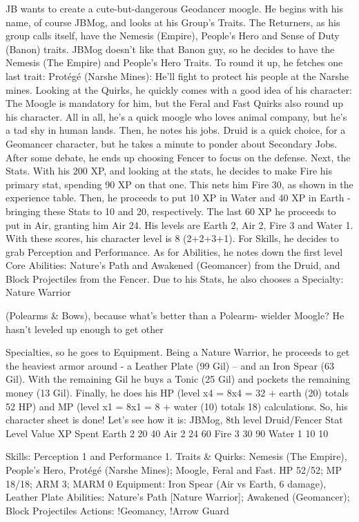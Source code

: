 \begin{multicols}{2}
JB wants to create a cute-but-dangerous Geodancer
moogle. He begins with his name, of course JBMog, and
looks at his Group's Traits. The Returners, as his group
calls itself, have the Nemesis (Empire), People's Hero and
Sense of Duty (Banon) traits. JBMog doesn't like that
Banon guy, so he decides to have the Nemesis (The
Empire) and People's Hero Traits. To round it up, he
fetches one last trait: Protégé (Narshe Mines): He'll fight
to protect his people at the Narshe mines.
Looking at the Quirks, he quickly comes with a
good idea of his character: The Moogle is mandatory for
him, but the Feral and Fast Quirks also round up his
character. All in all, he's a quick moogle who loves animal
company, but he's a tad shy in human lands.
Then, he notes his jobs. Druid is a quick choice,
for a Geomancer character, but he takes a minute to
ponder about Secondary Jobs. After some debate, he ends
up choosing Fencer to focus on the defense.
Next, the Stats. With his 200 XP, and looking at
the stats, he decides to make Fire his primary stat,
spending 90 XP on that one. This nets him Fire 30, as
shown in the experience table. Then, he proceeds to put
10 XP in Water and 40 XP in Earth - bringing these Stats
to 10 and 20, respectively. The last 60 XP he proceeds to
put in Air, granting him Air 24. His levels are Earth 2, Air
2, Fire 3 and Water 1. With these scores, his character
level is 8 (2+2+3+1). For Skills, he decides to grab
Perception and Performance.
As for Abilities, he notes down the first level Core
Abilities: Nature's Path and Awakened (Geomancer) from
the Druid, and Block Projectiles from the Fencer. Due to
his Stats, he also chooses a Specialty: Nature Warrior

(Polearms \& Bows), because what’s better than a Polearm-
wielder Moogle? He hasn't leveled up enough to get other

Specialties, so he goes to Equipment.
Being a Nature Warrior, he proceeds to get the
heaviest armor around - a Leather Plate (99 Gil) – and an
Iron Spear (63 Gil). With the remaining Gil he buys a
Tonic (25 Gil) and pockets the remaining money (13 Gil).
Finally, he does his HP (level x4 = 8x4 = 32 + earth (20)
totals 52 HP) and MP (level x1 = 8x1 = 8 + water (10)
totals 18) calculations.
So, his character sheet is done! Let's see how it is:
JBMog, 8th level Druid/Fencer
Stat Level Value XP Spent
Earth 2 20 40
Air 2 24 60
Fire 3 30 90
Water 1 10 10

Skills: Perception 1 and Performance 1.
Traits \& Quirks: Nemesis (The Empire), People's Hero,
Protégé (Narshe Mines); Moogle, Feral and Fast.
HP 52/52; MP 18/18; ARM 3; MARM 0
Equipment: Iron Spear (Air vs Earth, 6 damage), Leather
Plate
Abilities: Nature's Path [Nature Warrior]; Awakened
(Geomancer); Block Projectiles
Actions: !Geomancy, !Arrow Guard
\end{multicols}
